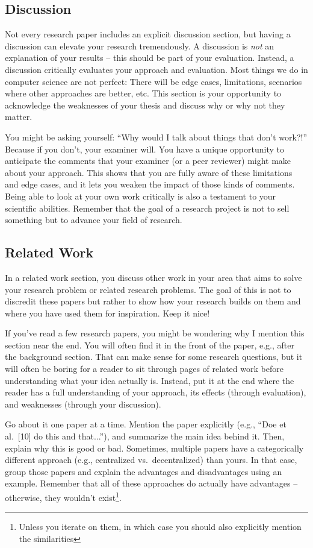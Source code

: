 \documentclass[a4]{article}
\begin{document}
\subsection{Discussion}
Not every research paper includes an explicit discussion section, but having a discussion can elevate your research tremendously.
A discussion is \emph{not} an explanation of your results -- this should be part of your evaluation.
Instead, a discussion critically evaluates your approach and evaluation.
Most things we do in computer science are not perfect:
There will be edge cases, limitations, scenarios where other approaches are better, etc.
This section is your opportunity to acknowledge the weaknesses of your thesis and discuss why or why not they matter.

You might be asking yourself:
``Why would I talk about things that don't work?!''
Because if you don't, your examiner will.
You have a unique opportunity to anticipate the comments that your examiner (or a peer reviewer) might make about your approach.
This shows that you are fully aware of these limitations and edge cases, and it lets you weaken the impact of those kinds of comments.
Being able to look at your own work critically is also a testament to your scientific abilities.
Remember that the goal of a research project is not to sell something but to advance your field of research.

\subsection{Related Work}
\label{subsec:relatedwork}

In a related work section, you discuss other work in your area that aims to solve your research problem or related research problems.
The goal of this is not to discredit these papers but rather to show how your research builds on them and where you have used them for inspiration.
Keep it nice!

If you've read a few research papers, you might be wondering why I mention this section near the end.
You will often find it in the front of the paper, e.g., after the background section.
That can make sense for some research questions, but it will often be boring for a reader to sit through pages of related work before understanding what your idea actually is.
Instead, put it at the end where the reader has a full understanding of your approach, its effects (through evaluation), and weaknesses (through your discussion).

Go about it one paper at a time.
Mention the paper explicitly (e.g., ``Doe et al.~[10] do this and that...''), and summarize the main idea behind it.
Then, explain why this is good or bad.
Sometimes, multiple papers have a categorically different approach (e.g., centralized vs.~decentralized) than yours.
In that case, group those papers and explain the advantages and disadvantages using an example.
Remember that all of these approaches do actually have advantages -- otherwise, they wouldn't exist\footnote{Unless you iterate on them, in which case you should also explicitly mention the similarities}.
\end{document}
